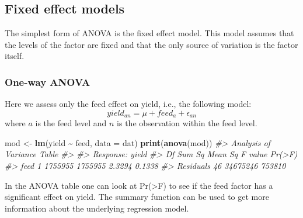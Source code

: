 \documentclass[
]{article}
\newenvironment{Shaded}{\begin{snugshade}}{\end{snugshade}}
\newcommand{\AttributeTok}[1]{\textcolor[rgb]{0.13,0.29,0.53}{#1}}
\newcommand{\CommentTok}[1]{\textcolor[rgb]{0.56,0.35,0.01}{\textit{#1}}}
\newcommand{\FunctionTok}[1]{\textcolor[rgb]{0.13,0.29,0.53}{\textbf{#1}}}
\newcommand{\NormalTok}[1]{#1}
\newcommand{\OtherTok}[1]{\textcolor[rgb]{0.56,0.35,0.01}{#1}}
\newcommand{\SpecialCharTok}[1]{\textcolor[rgb]{0.81,0.36,0.00}{\textbf{#1}}}
\begin{document}
\subsection{Fixed effect models}\label{fixed-effect-models}

The simplest form of ANOVA is the fixed effect model. This model assumes
that the levels of the factor are fixed and that the only source of
variation is the factor itself.

\subsubsection{One-way ANOVA}\label{one-way-anova}

Here we assess only the feed effect on yield, i.e., the following model:
\[yield_{an} = \mu + feed_a + \epsilon_{an}\] where \(a\) is the feed
level and \(n\) is the observation within the feed level.

\begin{Shaded}
\begin{Highlighting}[]
\NormalTok{mod }\OtherTok{\textless{}{-}} \FunctionTok{lm}\NormalTok{(yield }\SpecialCharTok{\textasciitilde{}}\NormalTok{ feed, }\AttributeTok{data =}\NormalTok{ dat)}
\FunctionTok{print}\NormalTok{(}\FunctionTok{anova}\NormalTok{(mod))}
\CommentTok{\#\textgreater{} Analysis of Variance Table}
\CommentTok{\#\textgreater{} }
\CommentTok{\#\textgreater{} Response: yield}
\CommentTok{\#\textgreater{}           Df   Sum Sq Mean Sq F value Pr(\textgreater{}F)}
\CommentTok{\#\textgreater{} feed       1  1755955 1755955  2.3294 0.1338}
\CommentTok{\#\textgreater{} Residuals 46 34675246  753810}
\end{Highlighting}
\end{Shaded}

In the ANOVA table one can look at Pr(\textgreater F) to see if the feed
factor has a significant effect on yield. The summary function can be
used to get more information about the underlying regression model.
\end{document}
